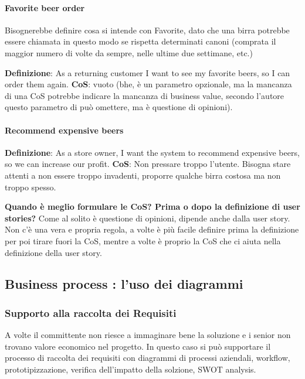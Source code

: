 \paragraph{Favorite beer order}
\begin{info}
	Bisognerebbe definire cosa si intende con Favorite, dato che una birra potrebbe essere chiamata in questo modo se rispetta determinati canoni (comprata il maggior numero di volte da sempre, nelle ultime due settimane, etc.)
\end{info}
\textbf{Definizione}: As a returning customer I want to see my favorite beers, so I can order them again.\newline
\textbf{CoS}: vuoto (bhe, è un parametro opzionale, ma la mancanza di una CoS potrebbe indicare la mancanza di business value, secondo l'autore questo parametro di può omettere, ma è questione di opinioni).\newline

\paragraph{Recommend expensive beers}
\textbf{Definizione}: As a store owner, I want the system to recommend expensive beers, so we can increase our profit.\newline
\textbf{CoS}: Non pressare troppo l'utente. Bisogna stare attenti a non essere troppo invadenti, proporre qualche birra costosa ma non troppo spesso. \newline

\begin{warn}
	\textbf{Quando è meglio formulare le CoS? Prima o dopo la definizione di user stories?}
	Come al solito è questione di opinioni, dipende anche dalla user story. Non c'è una vera e propria regola, a volte è più facile definire prima la definizione per poi tirare fuori la CoS, mentre a volte è proprio la CoS che ci aiuta nella definizione della user story.
\end{warn}

\subsection{Business process : l’uso dei diagrammi}
\subsubsection{Supporto alla raccolta dei Requisiti}
A volte il committente non riesce a immaginare bene la soluzione e i senior non trovano valore economico nel progetto. In questo caso si può supportare il processo di raccolta dei requisiti con diagrammi di processi aziendali, workflow, prototipizzazione, verifica dell'impatto della solzione, SWOT analysis.
